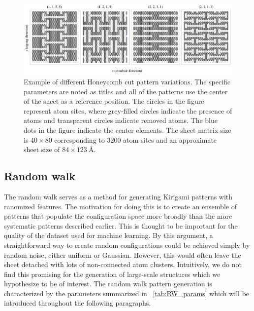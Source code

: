 \begin{figure}[!htb]
  \centering
  \includegraphics[width=\linewidth]{figures/system/honeycomb_flavors.pdf}
  \caption{Example of different Honeycomb cut pattern variations. The specific parameters are noted as titles and all of the patterns use the center of the sheet as a reference position. The circles in the figure represent atom sites, where grey-filled circles indicate the presence of atoms and transparent circles indicate removed atoms. The blue dots in the figure indicate the center elements. 
  The sheet matrix size is $40 \times 80$ corresponding to 3200 atom sites and an approximate sheet size of $84 \times \SI{123}{\text{Å}}$.}
  \label{fig:honeycomb_flavors}
\end{figure}



\subsection{Random walk}
The random walk serves as a method for generating Kirigami patterns with ranomized features. The motivation for doing this is to create an ensemble of patterns that populate the configuration space more broadly than the more systematic patterns described earlier. This is thought to be important for the quality of the dataset used for machine learning. By this argument, a straightforward way to create random configurations could be achieved simply by random noise, either uniform or Gaussian. However, this would often leave the sheet detached with lots of non-connected atom clusters. Intuitively, we do not find this promising for the generation of large-scale structures which we hypothesize to be of interest. The random walk pattern generation is characterized by the parameters summarized in ~\cref{tab:RW_params} which will be introduced throughout the following paragraphs. 

